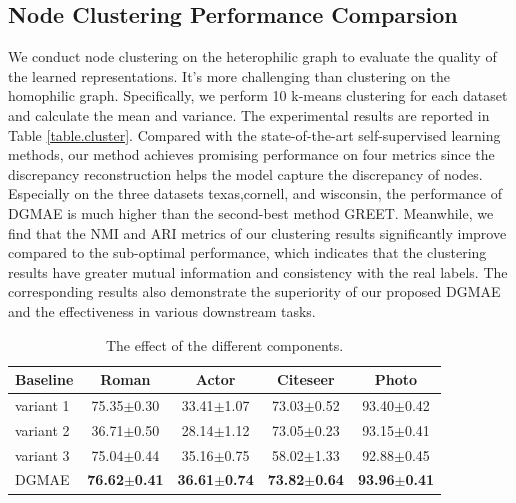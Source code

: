 \documentclass[sigconf]{acmart}
\begin{document}
\subsection{Node Clustering Performance Comparsion}
We conduct node clustering on the heterophilic graph to evaluate the quality of the learned representations.  It's more challenging than clustering on the homophilic graph.  Specifically, we perform 10 k-means clustering for each dataset and calculate the mean and variance. The experimental results are reported in Table \ref{table.cluster}.  Compared with the state-of-the-art self-supervised learning methods, our method achieves promising performance on four metrics since the discrepancy reconstruction helps the model capture the discrepancy of nodes. Especially on the three datasets texas,cornell, and wisconsin, the performance of DGMAE is much higher than the second-best method GREET. Meanwhile, we find that the NMI and ARI metrics of our clustering results significantly improve compared to the sub-optimal performance, which indicates that the clustering results have greater mutual information and consistency with the real labels. The corresponding results also demonstrate the superiority of our proposed DGMAE and the effectiveness in various downstream tasks.

\begin{table}[t]
     \caption{The effect of the different components.}
        \begin{tabular}{l|c c c c}
        \toprule
        Baseline  & Roman & Actor & Citeseer &Photo \\
        \midrule
       variant 1 & 75.35$\pm$0.30&33.41$\pm$1.07& 73.03$\pm$0.52&93.40$\pm$0.42   \\
        variant 2 &36.71$\pm$0.50&28.14$\pm$1.12&73.05$\pm$0.23&93.15$\pm$0.41\\
        variant 3 &75.04$\pm$0.44&35.16$\pm$0.75&58.02$\pm$1.33&92.88$\pm$0.45 \\  
        DGMAE &\textbf{76.62$\pm$0.41}&\textbf{36.61$\pm$0.74}&\textbf{73.82$\pm$0.64}&\textbf{93.96$\pm$0.41} \\  
        \bottomrule
    \end{tabular}
        \label{components}
\end{table}
\end{document}
